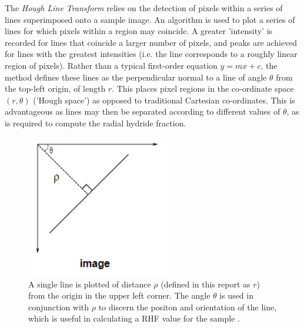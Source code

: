\documentclass{article}
\begin{document}
	The \textit{Hough Line Transform} relies on the detection of pixels within a series of lines superimposed onto a sample image. An algorithm is used to plot a series of lines for which pixels within a region may coincide. A greater 'intensity' is recorded for lines that coincide a larger number of pixels, and peaks are achieved for lines with the greatest intensities (i.e. the line corresponds to a roughly linear region of pixels). Rather than a typical first-order equation $y=mx+c$, the method defines these lines as the perpendicular normal to a line of angle $\theta$ from the top-left origin, of length $r$. This places pixel regions in the co-ordinate space $(r,\theta)$ ('Hough space') as opposed to traditional Cartesian co-ordinates. This is advantageous as lines may then be separated according to different values of $\theta$, as is required to compute the radial hydride fraction.
	\\
	\begin{figure}[H]
		\centering
		\includegraphics[width=2.5in]{Figures/houghtransform.PNG} 
		\caption{A single line is plotted of distance $\rho$ (defined in this report as $r$) from the origin in the upper left corner. The angle $\theta$ is used in conjunction with $\rho$ to discern the positon and orientation of the line, which is useful in calculating a RHF value for the sample \cite{OpenCV2013}.}
		\label{MedialAxis}
	\end{figure}
	\newpage
	
\end{document}
